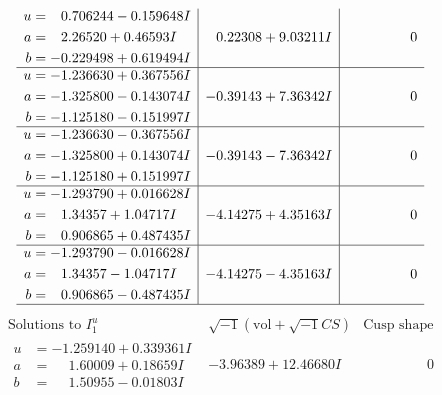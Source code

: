 \documentclass[1p]{elsarticle_modified}
\theoremstyle{definition}
\newcommand{\I}{\sqrt{-1}}
\begin{document}
$$\begin{array}{c|c|c}
\begin{aligned}
u &= \phantom{-}0.706244 - 0.159648 I \\
a &= \phantom{-}2.26520 + 0.46593 I \\
b &= -0.229498 + 0.619494 I\end{aligned}
 & \phantom{-}0.22308 + 9.03211 I & \phantom{-0.000000 } 0 \\ \hline\begin{aligned}
u &= -1.236630 + 0.367556 I \\
a &= -1.325800 - 0.143074 I \\
b &= -1.125180 - 0.151997 I\end{aligned}
 & -0.39143 + 7.36342 I & \phantom{-0.000000 } 0 \\ \hline\begin{aligned}
u &= -1.236630 - 0.367556 I \\
a &= -1.325800 + 0.143074 I \\
b &= -1.125180 + 0.151997 I\end{aligned}
 & -0.39143 - 7.36342 I & \phantom{-0.000000 } 0 \\ \hline\begin{aligned}
u &= -1.293790 + 0.016628 I \\
a &= \phantom{-}1.34357 + 1.04717 I \\
b &= \phantom{-}0.906865 + 0.487435 I\end{aligned}
 & -4.14275 + 4.35163 I & \phantom{-0.000000 } 0 \\ \hline\begin{aligned}
u &= -1.293790 - 0.016628 I \\
a &= \phantom{-}1.34357 - 1.04717 I \\
b &= \phantom{-}0.906865 - 0.487435 I\end{aligned}
 & -4.14275 - 4.35163 I & \phantom{-0.000000 } 0\\
 \hline 
 \end{array}$$\newpage$$\begin{array}{c|c|c}  
\text{Solutions to }I^u_{1}& \I (\text{vol} + \sqrt{-1}CS) & \text{Cusp shape}\\
 \hline 
\begin{aligned}
u &= -1.259140 + 0.339361 I \\
a &= \phantom{-}1.60009 + 0.18659 I \\
b &= \phantom{-}1.50955 - 0.01803 I\end{aligned}
 & -3.96389 + 12.46680 I & \phantom{-0.000000 } 0 \\ \hline\begin{aligned}

\end{aligned}
\end{array}$$
\end{document}
